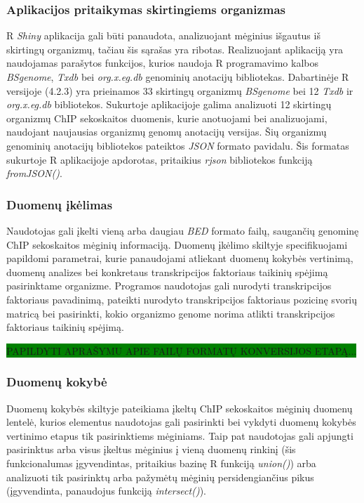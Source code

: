 \documentclass[12pt]{article}
\begin{document}
\subsubsection*{Aplikacijos pritaikymas skirtingiems organizmas}
R \emph{Shiny} aplikacija gali būti panaudota, analizuojant mėginius išgautus
iš skirtingų organizmų, tačiau šis sąrašas yra ribotas. Realizuojant aplikaciją
yra naudojamas parašytos funkcijos, kurios naudoja R programavimo kalbos
\emph{BSgenome}, \emph{Txdb} bei \emph{org.x.eg.db} genominių anotacijų
bibliotekas. Dabartinėje R versijoje (4.2.3) yra prieinamos 33 skirtingų
organizmų \emph{BSgenome} bei 12 \emph{Txdb} ir \emph{org.x.eg.db} bibliotekos.
Sukurtoje aplikacijoje galima analizuoti 12 skirtingų organizmų ChIP sekoskaitos
duomenis, kurie anotuojami bei analizuojami, naudojant naujausias organizmų
genomų anotacijų versijas. Šių organizmų genominių anotacijų bibliotekos
pateiktos \emph{JSON}\cite{JSON} formato pavidalu. Šis formatas sukurtoje
R aplikacijoje apdorotas, pritaikius \emph{rjson}\cite{RJSON} bibliotekos
funkciją \emph{fromJSON()}.

\subsubsection*{Duomenų įkėlimas}
Naudotojas gali įkelti vieną arba daugiau \emph{BED} formato failų, saugančių
genominę ChIP sekoskaitos mėginių informaciją. Duomenų įkėlimo skiltyje
specifikuojami papildomi parametrai, kurie panaudojami atliekant duomenų kokybės
vertinimą, duomenų analizes bei konkretaus transkripcijos faktoriaus taikinių
spėjimą pasirinktame organizme. Programos naudotojas gali nurodyti
transkripcijos faktoriaus pavadinimą, pateikti nurodyto transkripcijos
faktoriaus pozicinę svorių matricą bei pasirinkti, kokio organizmo genome
norima atlikti transkripcijos faktoriaus taikinių spėjimą.

\colorbox{green}{PAPILDYTI APRAŠYMU APIE FAILŲ FORMATŲ KONVERSIJOS ETAPĄ...}

\subsubsection*{Duomenų kokybė}
Duomenų kokybės skiltyje pateikiama įkeltų ChIP sekoskaitos mėginių duomenų
lentelė, kurios elementus naudotojas gali pasirinkti bei vykdyti duomenų
kokybės vertinimo etapus tik pasirinktiems mėginiams. Taip pat naudotojas
gali apjungti pasirinktus arba visus įkeltus mėginius į vieną duomenų rinkinį
(šis funkcionalumas įgyvendintas, pritaikius bazinę R funkciją \emph{union()})
arba analizuoti tik pasirinktų arba pažymėtų mėginių persidengiančius pikus
(įgyvendinta, panaudojus funkciją \emph{intersect()}).
\end{document}
